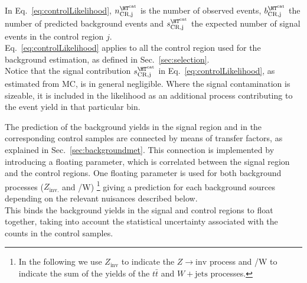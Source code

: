 In Eq.~\ref{eq:controlLikelihood}, $n^{\htcat}_{\mathrm{CR,j}}$ is the number of observed events, $b^{\htcat}_{\mathrm{CR,j}}$ the number of predicted 
background events and $s^{\htcat}_{\mathrm{CR,j}}$ the expected number of signal events in the control region $j$. \\
Eq.~\ref{eq:controlLikelihood} applies to all the control region used for the background estimation, 
as defined in Sec.~\ref{sec:selection}. \\
Notice that the signal contribution $s^{\htcat}_{\mathrm{CR,j}}$ in Eq.~\ref{eq:controlLikelihood}, as estimated from MC, is in general negligible. 
Where the signal contamination is sizeable, it is included in the likelihood as an additional process contributing to the event yield in that particular bin.

The prediction of the background yields in the signal region and in the corresponding control samples are connected 
by means of transfer factors, as explained in Sec.~\ref{sec:backgroundmet}. 
This connection is implemented by introducing a floating parameter, which is correlated 
between the signal region and the control regions. 
One floating parameter is used for both background 
processes ($Z_{\mathrm{inv.}}$ and \ttbar/W) \footnote{In the following we use $Z_{\mathrm{inv}}$ to indicate 
the $Z\to \mathrm{inv}$ process and \ttbar/W to indicate the sum of the yields of the $t\bar{t}$ and $W+\mathrm{jets}$ processes.}
giving a prediction for each background sources depending on the relevant nuisances described below. \\
This binds the background yields in the signal and control regions to float together, 
taking into account the statistical uncertainty associated with the counts in the control samples. 

